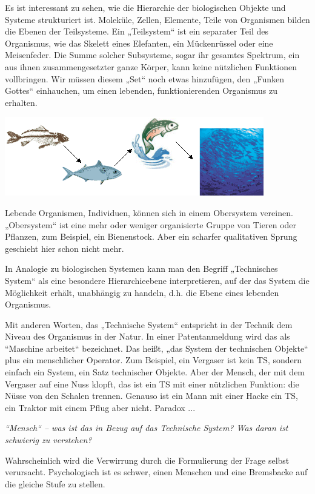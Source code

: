 \documentclass[11pt,a4paper]{article}
\begin{document}
Es ist interessant zu sehen, wie die Hierarchie der biologischen Objekte und
Systeme strukturiert ist. Moleküle, Zellen, Elemente, Teile von Organismen
bilden die Ebenen der Teilsysteme.  Ein „Teilsystem“ ist ein separater Teil
des Organismus, wie das Skelett eines Elefanten, ein Mückenrüssel oder eine
Meisenfeder. Die Summe solcher Subsysteme, sogar ihr gesamtes Spektrum, ein
aus ihnen zusammengesetzter ganze Körper, kann keine nützlichen Funktionen
vollbringen.  Wir müssen diesem „Set“ noch etwas hinzufügen, den „Funken
Gottes“ einhauchen, um einen lebenden, funktionierenden Organismus zu
erhalten.
\begin{center}
 \includegraphics[width=.6\textwidth]{mts-2.png}
\end{center}

Lebende Organismen, Individuen, können sich in einem Obersystem vereinen.
„Obersystem“ ist eine mehr oder weniger organisierte Gruppe von Tieren oder
Pflanzen, zum Beispiel, ein Bienenstock. Aber ein scharfer
qualitativen Sprung geschieht hier schon nicht mehr. 

In Analogie zu biologischen Systemen kann man den Begriff „Technisches System“
als eine besondere Hierarchieebene interpretieren, auf der das System die
Möglichkeit erhält, unabhängig zu handeln, d.h. die Ebene eines lebenden
Organismus.

Mit anderen Worten, das „Technische System“ entspricht in der Technik dem
Niveau des Organismus in der Natur. In einer Patentanmeldung wird das als
“Maschine arbeitet“ bezeichnet. Das heißt, „das System der technischen
Objekte“ plus ein menschlicher Operator. Zum Beispiel, ein Vergaser ist kein
TS, sondern einfach ein System, ein Satz technischer Objekte. Aber der Mensch,
der mit dem Vergaser auf eine Nuss klopft, das ist ein TS mit einer nützlichen
Funktion: die Nüsse von den Schalen trennen.  Genauso ist ein Mann mit einer
Hacke ein TS, ein Traktor mit einem Pflug aber nicht. Paradox ...

\emph{“Mensch“ -- was ist das in Bezug auf das Technische System? Was daran
  ist schwierig zu verstehen? }

Wahrscheinlich wird die Verwirrung durch die Formulierung der Frage selbst
verursacht.  Psychologisch ist es schwer, einen Menschen und eine Bremsbacke
auf die gleiche Stufe zu stellen.
\end{document}
